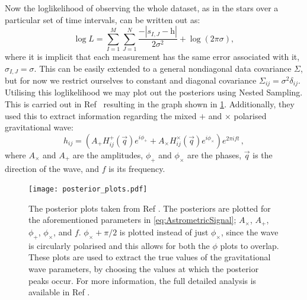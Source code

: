 Now the loglikelihood of observing the whole dataset, as in the stars over a particular set of time intervals, can be written out as:
%
\begin{equation}
    \log L = \sum^M_{I=1} \sum^N_{J=1} \frac{- | s_{I,J} - \mathbf{ \mathrm{h} }|}{2 \sigma^2}+\log (2\pi \sigma),
\end{equation}
%
where it is implicit that each measurement has the same error associated with it, $\sigma_{I,J}=\sigma$. This can be easily extended to a general nondiagonal data covariance $\Sigma$, but for now we restrict ourselves to constant and diagonal covariance $\Sigma_{ij}=\sigma^2 \delta_{ij}$. Utilising this loglikelihood we may plot out the posteriors using Nested Sampling. This is carried out in Ref~\cite{Mihaylov_2020} resulting in the graph shown in \cref{fig:lasenbyposteriors}. Additionally, they used this to extract information regarding the mixed $+$ and $\times$ polarised gravitational wave:
%
\begin{equation}\label{eq:AstrometricSignal} h_{ij}\!=\!\left(A_{+}H^{+}_{ij}(\vec{q})e^{i\phi_{+}}\!+\!A_{\times}H^{\times}_{ij}(\vec{q})e^{i\phi_{\times}}\right)e^{2\pi i f  t} \,, 
\end{equation} 
%
where $A_{\times}$ and $A_{+}$ are the amplitudes, $\phi_{+}$ and $\phi_{\times}$ are the phases, $\vec{q}$ is the direction of the wave, and $f$ is its frequency.



\begin{figure}
\centering    
\texttt{[image: posterior\_plots.pdf]}
\caption{\label{fig:epsart2} The posterior plots taken from Ref \cite{Mihaylov_2020}. The posteriors are plotted for the aforementioned parameters in \cref{eq:AstrometricSignal}; $A_{\times}$, $A_{+}$, $\phi_{+}$, $\phi_{\times}$, and $f$. $\phi_{\times}+\pi/2$ is plotted instead of just $\phi_{\times}$, since the wave is circularly polarised and this allows for both the $\phi$ plots to overlap. These plots are used to extract the true values of the gravitational wave parameters, by choosing the values at which the posterior peaks occur. For more information, the full detailed analysis is available in Ref \cite{Mihaylov_2020}.}
\label{fig:lasenbyposteriors}
\end{figure}


